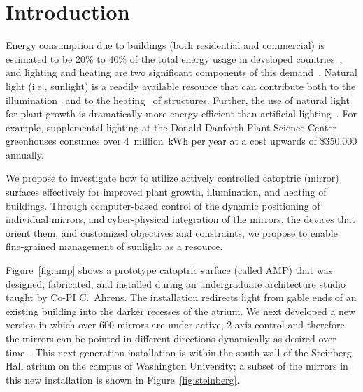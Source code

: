 \section{Introduction}
\label{sec:intro}


Energy consumption due to buildings (both residential and commercial)
is estimated to be 20\% to 40\% of the total energy usage in
developed countries~\cite{pop08}, and
lighting and heating are two significant components of this demand~\cite{keh05}.
Natural light (i.e., sunlight) is a readily available resource that
can contribute both to the illumination~\cite{Leslie03}
and to the heating~\cite{Lunde80} of structures.
Further, the use of natural light for plant growth is dramatically more
energy efficient than artificial lighting~\cite{Bugbee16}.
For example, supplemental lighting at the Donald Danforth Plant Science Center
greenhouses consumes over 4~million~kWh per year at a cost upwards of
\$350,000 annually.

We propose to investigate how to utilize actively
controlled catoptric (mirror) surfaces effectively for improved
plant growth, illumination, and heating of buildings.  Through computer-based control of
the dynamic positioning of
individual mirrors, and cyber-physical integration of the mirrors,
the devices
that orient them, and customized objectives and
constraints,
we propose to enable fine-grained management of sunlight as a resource.

Figure~\ref{fig:amp} shows a prototype catoptric surface (called AMP) that was 
designed, fabricated, and installed during an undergraduate architecture studio 
taught by Co-PI C.~Ahrens. The installation redirects light from gable ends of an 
existing building into the darker recesses of the atrium.
We next developed a
new version in which over 600 mirrors are under 
active, 2-axis control and therefore the mirrors
can be pointed in different directions dynamically as desired over
time~\cite{acmbg19,acmb18,cagm18}. 
This next-generation installation is within 
the south wall of the Steinberg Hall atrium on the campus of 
Washington University; a subset of the mirrors in this new
installation is shown in Figure~\ref{fig:steinberg}.

